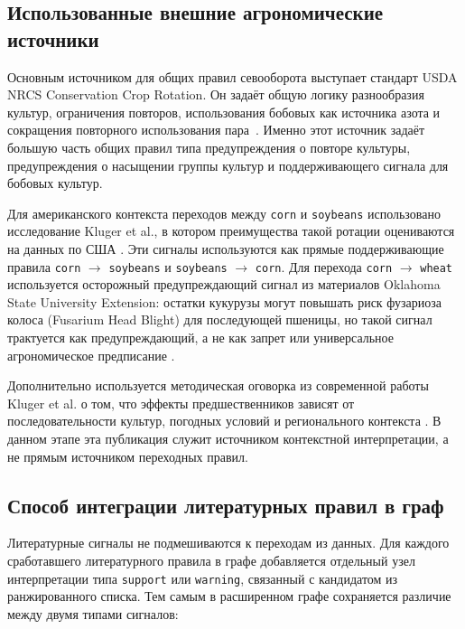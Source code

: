 \subsection{Использованные внешние агрономические источники}

Основным источником для общих правил севооборота выступает стандарт USDA NRCS Conservation Crop Rotation.
Он задаёт общую логику разнообразия культур, ограничения повторов,
использования бобовых как источника азота и сокращения повторного использования пара~\cite{nrcs2014conservation_crop_rotation}.
Именно этот источник задаёт большую часть общих правил типа
предупреждения о повторе культуры, предупреждения о насыщении группы культур и поддерживающего сигнала для бобовых
культур.

Для американского контекста переходов между \texttt{corn} и \texttt{soybeans} использовано исследование
Kluger et al., в котором преимущества такой ротации оцениваются на данных по США
\cite{kluger2021rotation_corn_soy}. Эти сигналы используются как прямые поддерживающие правила
\texttt{corn} $\rightarrow$ \texttt{soybeans} и \texttt{soybeans} $\rightarrow$ \texttt{corn}. Для перехода
\texttt{corn} $\rightarrow$ \texttt{wheat} используется осторожный предупреждающий сигнал из материалов Oklahoma
State University Extension: остатки кукурузы могут повышать риск фузариоза колоса (Fusarium Head Blight) для
последующей пшеницы, но такой сигнал трактуется как предупреждающий, а не как запрет или универсальное
агрономическое предписание \cite{osu2017corn_residue_wheat_fhb}.

Дополнительно используется методическая оговорка из современной работы Kluger et al. о том, что эффекты
предшественников зависят от последовательности культур, погодных условий и регионального контекста
\cite{kluger2025precrop_effects}. В данном этапе эта публикация служит источником контекстной интерпретации, а не
прямым источником переходных правил.

\subsection{Способ интеграции литературных правил в граф}

Литературные сигналы не подмешиваются к переходам из данных. Для каждого
сработавшего литературного правила в графе добавляется отдельный узел интерпретации типа \texttt{support} или
\texttt{warning}, связанный с кандидатом из ранжированного списка. Тем самым в расширенном графе сохраняется
различие между двумя типами сигналов:

